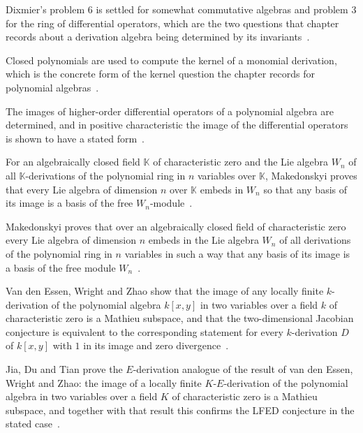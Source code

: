 Dixmier's problem 6 is settled for somewhat commutative algebras and problem 3 for the ring of differential operators, which are the two questions that chapter records about a derivation algebra being determined by its invariants~\cite{WlDixmierSProblem6ForSomewhatCom2005}.

Closed polynomials are used to compute the kernel of a monomial derivation, which is the concrete form of the kernel question the chapter records for polynomial algebras~\cite{WlClosedPolynomialsAndTheirAppli2019}.

The images of higher-order differential operators of a polynomial algebra are determined, and in positive characteristic the image of the differential operators is shown to have a stated form~\cite{WlImagesOfHigherOrderDifferentia2019}.

For an algebraically closed field $\mathbb{K}$ of characteristic zero and the Lie algebra $W_n$ of all $\mathbb{K}$-derivations of the polynomial ring in $n$ variables over $\mathbb{K}$, Makedonskyi proves that every Lie algebra of dimension $n$ over $\mathbb{K}$ embeds in $W_n$ so that any basis of its image is a basis of the free $W_n$-module~\cite{WlOnNoncommutativeBasesOfFreeMod2015}.

Makedonskyi proves that over an algebraically closed field of characteristic zero every Lie algebra of dimension $n$ embeds in the Lie algebra $W_n$ of all derivations of the polynomial ring in $n$ variables in such a way that any basis of its image is a basis of the free module $W_n$~\cite{WlOnNoncommutativeBasesOfFreeMod2015}.

Van den Essen, Wright and Zhao show that the image of any locally finite $k$-derivation of the polynomial algebra $k[x,y]$ in two variables over a field $k$ of characteristic zero is a Mathieu subspace, and that the two-dimensional Jacobian conjecture is equivalent to the corresponding statement for every $k$-derivation $D$ of $k[x,y]$ with $1$ in its image and zero divergence~\cite{WlImagesOfLocallyFiniteDerivatio2011}.

Jia, Du and Tian prove the $E$-derivation analogue of the result of van den Essen, Wright and Zhao: the image of a locally finite $K$-$E$-derivation of the polynomial algebra in two variables over a field $K$ of characteristic zero is a Mathieu subspace, and together with that result this confirms the LFED conjecture in the stated case~\cite{WlImagesOfLocallyFiniteEDerivati2023}.
